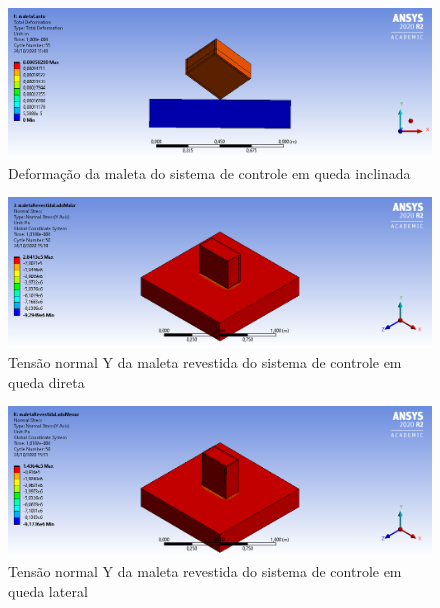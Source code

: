 \begin{apendicesenv}
\begin{figure}[htb]
    \centering
    \includegraphics[width=1.0\textwidth, angle=0]{figuras/estrutura_simulacaoImpacto/maletaDeformacaoCanto.png}
    \caption{Deformação da maleta do sistema de controle em queda inclinada}
    \label{fig:simulacaoImpacto_27}
\end{figure}

\begin{figure}[htb]
    \centering
    \includegraphics[width=1.0\textwidth, angle=0]{figuras/estrutura_simulacaoImpacto/maletaRevestidaNormalYMaior.png}
    \caption{Tensão normal Y da maleta revestida do sistema de controle em queda direta}
    \label{fig:simulacaoImpacto_28}
\end{figure}

\begin{figure}[htb]
    \centering
    \includegraphics[width=1.0\textwidth, angle=0]{figuras/estrutura_simulacaoImpacto/maletaRevestidaNormalYMenor.png}
    \caption{Tensão normal Y da maleta revestida do sistema de controle em queda lateral}
    \label{fig:simulacaoImpacto_29}
\end{figure}


\end{apendicesenv}
